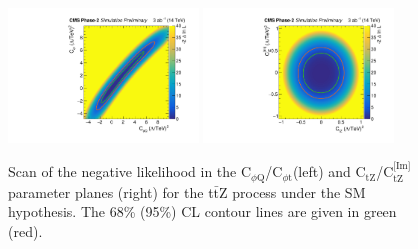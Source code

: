 \documentclass[letterpaper,11pt]{article}
\def\ttZ{t$\bar{\text{t}}$Z\xspace}
\def\ctZ{C$_\text{tZ}$\xspace}
\def\ctZI{C$_\text{tZ}^\text{[Im]}$\xspace}
\def\cpt{C$_{\phi \text{t}}$\xspace}
\def\cpQM{C$_{\phi \text{Q}}$\xspace}
\begin{document}
\begin{figure}[tbp]
  \centering
    \includegraphics[trim={0.4cm 0.cm 0.8cm 0.cm},clip,width=0.45\textwidth]{Figures/cpQM_cpt_lumi3000_14TeV_CMScombine_r1_fullUnc.pdf}
    \includegraphics[trim={0.4cm 0.cm 0.8cm 0.cm},clip,width=0.45\textwidth]{Figures/ctZ_ctZI_lumi3000_14TeV_CMScombine_r1_fullUnc.pdf}
  \caption{Scan of the negative likelihood in the \cpQM/\cpt (left) and \ctZ/\ctZI parameter planes (right) for the \ttZ process under the SM hypothesis.
           The 68\% (95\%) CL contour lines are given in green (red).
           }
  \label{fig:ttZ_nll}
\end{figure}

\clearpage


\end{document}
